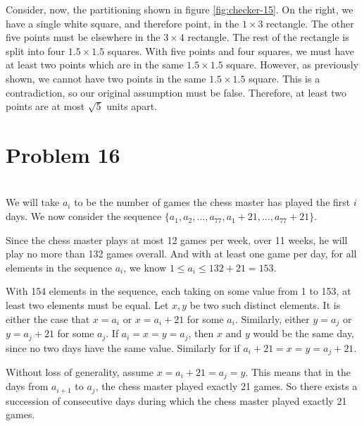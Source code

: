 \documentclass[12pt]{article}
\begin{document}
Consider, now, the partitioning shown in figure \ref{fig:checker-15}. On the right, we have a single white square, and therefore point, in the $1\times3$ rectangle. The other five points must be elsewhere in the $3\times4$ rectangle. The rest of the rectangle is split into four $1.5\times1.5$ squares. With five points and four squares, we must have at least two points which are in the same $1.5\times1.5$ square. However, as previously shown, we cannot have two points in the same $1.5\times1.5$ square. This is a contradiction, so our original assumption must be false. Therefore, at least two points are at most $\sqrt{5}$ units apart.


\section*{Problem 16}
\\

We will take $a_i$ to be the number of games the chess master has played the first $i$ days. We now consider the sequence $\{a_1, a_2, \dots, a_{77}, a_1+ 21, \dots, a_{77} + 21\}$.

Since the chess master plays at most 12 games per week, over 11 weeks, he will play no more than 132 games overall. And with at least one game per day, for all elements in the sequence $a_i$, we know $1\leq a_i \leq 132+21=153$.

With 154 elements in the sequence, each taking on some value from 1 to 153, at least two elements must be equal. Let $x,y$ be two such distinct elements. It is either the case that $x=a_i$ or $x=a_i+21$ for some $a_i$. Similarly, either $y=a_j$ or $y=a_j+21$ for some $a_j$. If $a_i=x=y=a_j$, then $x$ and $y$ would be the same day, since no two days have the same value. Similarly for if $a_i+21=x=y=a_j+21$. 

Without loss of generality, assume $x=a_i+21=a_j=y$. This means that in the days from $a_{i+1}$ to $a_j$, the chess master played exactly 21 games. So there exists a succession of consecutive days during which the chess master played exactly 21 games.
\end{document}
